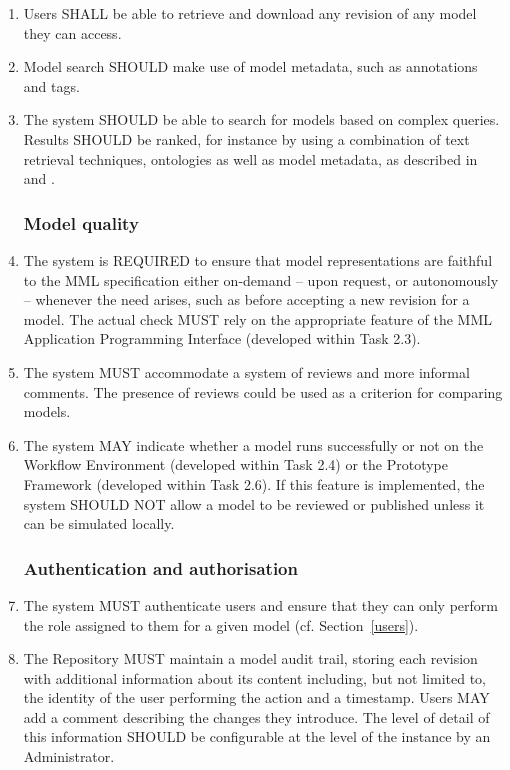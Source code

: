 \begin{enumerate}[1]
\item Users SHALL be able to retrieve and download any revision of any model they can access.

\item Model search SHOULD make use of model metadata, such as annotations and tags.

\item The system SHOULD be able to search for models based on complex queries. Results SHOULD be ranked, for instance by using a combination of text retrieval techniques, ontologies as well as model metadata, as described in \cite{Henkel2010} and \cite{Schulz2011}. 

\subsubsection{Model quality}
\item The system is REQUIRED to ensure that model representations are faithful to the MML specification either on-demand -- upon request, or autonomously -- whenever the need arises, such as before accepting a new revision for a model. The actual check MUST rely on the appropriate feature of the MML Application Programming Interface (developed within Task 2.3).

\item The system MUST accommodate a system of reviews and more informal comments. The presence of reviews could be used as a criterion for comparing models.

\item The system MAY indicate whether a model runs successfully or not on the Workflow Environment (developed within Task 2.4) or the Prototype Framework (developed within Task 2.6). If this feature is implemented, the system SHOULD NOT allow a model to be reviewed or published unless it can be simulated locally. 

\subsubsection{Authentication and authorisation}
\item The system MUST authenticate users and ensure that they can only perform the role assigned to them for a given model (cf. Section~\ref{users}).

\item The Repository MUST maintain a model \gls{audit trail}, storing each revision with additional information about its content including, but not limited to, the identity of the user performing the action and a timestamp. Users MAY add a comment describing the changes they introduce. The level of detail of this information SHOULD be configurable at the level of the instance by an Administrator. 


\end{enumerate}
